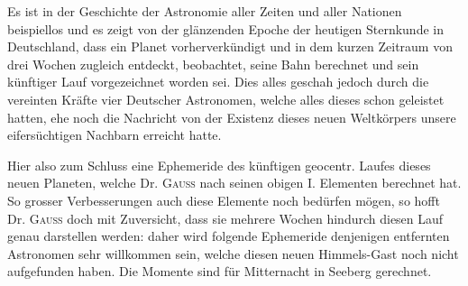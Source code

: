 Es ist in der Geschichte der Astronomie aller Zeiten und aller Nationen beispiellos und es zeigt von der glänzenden Epoche der heutigen Sternkunde in Deutschland, dass ein Planet vorherverkündigt und in dem kurzen Zeitraum von drei Wochen zugleich entdeckt, beobachtet, seine Bahn berechnet und sein künftiger Lauf vorgezeichnet worden sei. Dies alles geschah jedoch durch die vereinten Kräfte vier Deutscher Astronomen, welche alles dieses schon geleistet hatten, ehe noch die Nachricht von der Existenz dieses neuen Weltkörpers unsere eifersüchtigen Nachbarn erreicht hatte.

Hier also zum Schluss eine Ephemeride des künftigen geocentr. Laufes dieses neuen Planeten, welche Dr. \textsc{Gauss} nach seinen obigen I. Elementen berechnet hat. So grosser Verbesserungen auch diese Elemente noch bedürfen mögen, so hofft Dr. \textsc{Gauss} doch mit Zuversicht, dass sie mehrere Wochen hindurch diesen Lauf genau darstellen werden: daher wird folgende Ephemeride denjenigen entfernten Astronomen sehr willkommen sein, welche diesen neuen Himmels-Gast noch nicht aufgefunden haben. Die Momente sind für Mitternacht in Seeberg gerechnet.

